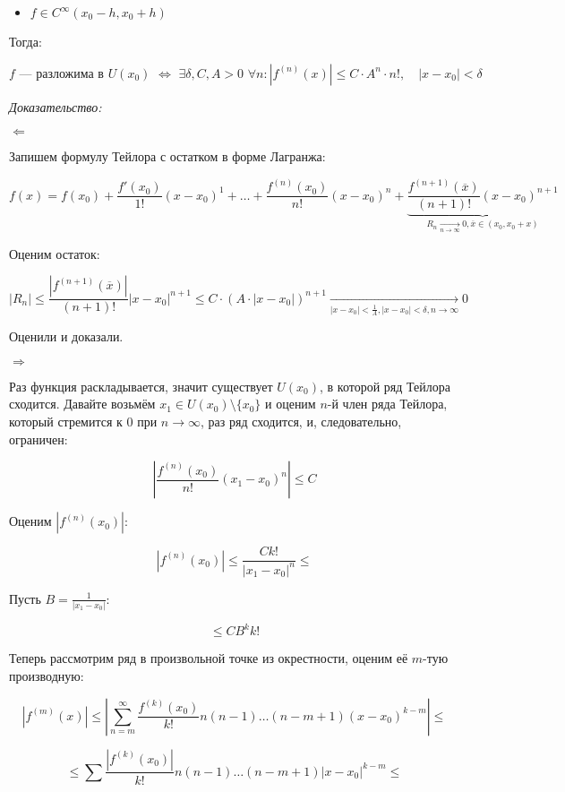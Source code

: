 \documentclass{article}
\def\dbl{\,\,}
\begin{document}
\begin{itemize}
    \item $f \in C^{\infty}(x_0 - h, x_0 + h)$
\end{itemize}

Тогда:

\[f\text{ --- разложима в } U(x_0) \dbl \Leftrightarrow \dbl \exists \delta, C, A > 0 \dbl \forall n: |f^{(n)}(x)| \le C \cdot A^n \cdot n!, \quad |x - x_0| < \delta\]

\textit{Доказательство:}

\textbf{$\Leftarrow$}

Запишем формулу Тейлора с остатком в форме Лагранжа: 

\[f(x) = f(x_0) + \frac{f'(x_0)}{1!}(x - x_0)^{1} + \ldots + \frac{f^{(n)}(x_0)}{n!}(x - x_0)^n + \underbrace{\frac{f^{(n + 1)}(\overline{x})}{(n + 1)!}(x - x_0)^{n + 1}}_{R_n \underset{n \rightarrow \infty}{\longrightarrow} 0, \overline{x} \in (x_0, x_0 + x)}\]

Оценим остаток: 

\[|R_n| \le \frac{\left|f^{(n + 1)}(\overline{x})\right|}{(n + 1)!}|x - x_0|^{n + 1} \le C \cdot \left(A \cdot |x - x_0| \right)^{n + 1} \underset{|x - x_0| < \frac{1}{A}, |x - x_0| < \delta, n \rightarrow \infty}{\longrightarrow} 0\]

Оценили и доказали.

\textbf{$\Rightarrow$}

Раз функция раскладывается, значит существует $U(x_0)$, в которой ряд Тейлора сходится. Давайте возьмём $x_1 \in U(x_0) \setminus \{x_0\}$ и оценим $n$-й член ряда Тейлора, который стремится к 0 при $n \rightarrow \infty$, раз ряд сходится, и, следовательно, ограничен: 

\[\left|\frac{f^{(n)}(x_0)}{n!}(x_1 - x_0)^n\right| \le C\]

Оценим $|f^{(n)}(x_0)|$:

\[\left|f^{(n)}(x_0)\right| \le \frac{C k!}{|x_1 - x_0|^n} \le\]

Пусть $B = \frac{1}{|x_1 - x_0|}$:

\[\le CB^kk!\]

Теперь рассмотрим ряд в произвольной точке из окрестности, оценим её $m$-тую производную:

\[\left|f^{(m)}(x)\right| \le \left|\sum_{n = m}^{\infty}\frac{f^{(k)}(x_0)}{k!}n(n - 1)\ldots(n - m + 1)(x - x_0)^{k - m}\right| \le \]

\[\le \sum \frac{\left|f^{(k)}(x_0)\right|}{k!}n(n - 1)\ldots(n - m + 1)|x - x_0|^{k - m} \le\]
\end{document}
